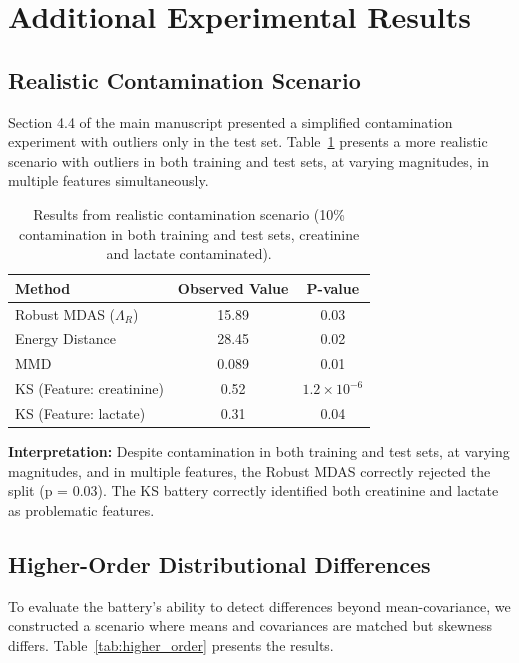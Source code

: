 \documentclass[10pt,a4paper]{article}
\begin{document}
\section{Additional Experimental Results}

\subsection{Realistic Contamination Scenario}

Section 4.4 of the main manuscript presented a simplified contamination experiment with outliers only in the test set. Table~\ref{tab:realistic_contamination} presents a more realistic scenario with outliers in both training and test sets, at varying magnitudes, in multiple features simultaneously.

\begin{table}[H]
\centering
\caption{Results from realistic contamination scenario (10\% contamination in both training and test sets, creatinine and lactate contaminated).}
\label{tab:realistic_contamination}
\begin{tabular}{lcc}
\toprule
Method & Observed Value & P-value \\
\midrule
Robust MDAS ($\Lambda_R$) & 15.89 & 0.03 \\
Energy Distance & 28.45 & 0.02 \\
MMD & 0.089 & 0.01 \\
KS (Feature: creatinine) & 0.52 & $1.2 \times 10^{-6}$ \\
KS (Feature: lactate) & 0.31 & 0.04 \\
\bottomrule
\end{tabular}
\end{table}

\textbf{Interpretation:} Despite contamination in both training and test sets, at varying magnitudes, and in multiple features, the Robust MDAS correctly rejected the split (p = 0.03). The KS battery correctly identified both creatinine and lactate as problematic features.

\subsection{Higher-Order Distributional Differences}

To evaluate the battery's ability to detect differences beyond mean-covariance, we constructed a scenario where means and covariances are matched but skewness differs. Table~\ref{tab:higher_order} presents the results.
\end{document}
